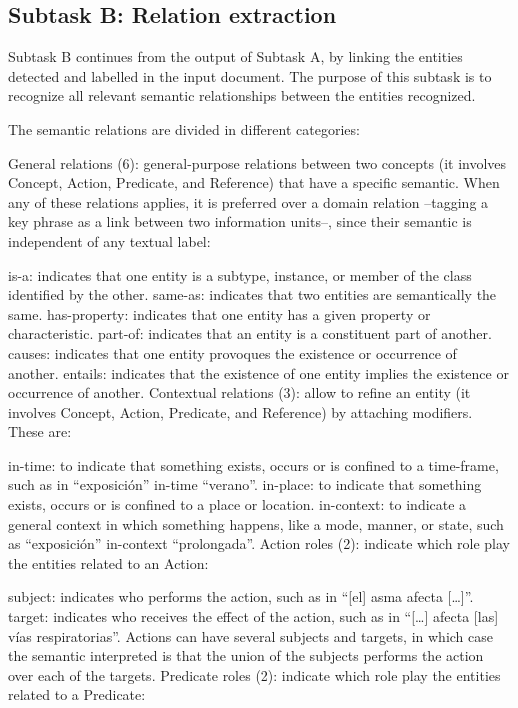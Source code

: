 \documentclass[a4paper,11pt,twocolumn,twoside]{article}
\begin{document}
\subsection{Subtask B: Relation extraction}

Subtask B continues from the output of Subtask A, by linking the entities detected and labelled in the input document. The purpose of this subtask is to recognize all relevant semantic relationships between the entities recognized. 

The semantic relations are divided in different categories:

General relations (6): general-purpose relations between two concepts (it involves Concept, Action, Predicate, and Reference) that have a specific semantic. When any of these relations applies, it is preferred over a domain relation –tagging a key phrase as a link between two information units–, since their semantic is independent of any textual label:

is-a: indicates that one entity is a subtype, instance, or member of the class identified by the other.
same-as: indicates that two entities are semantically the same.
has-property: indicates that one entity has a given property or characteristic.
part-of: indicates that an entity is a constituent part of another.
causes: indicates that one entity provoques the existence or occurrence of another.
entails: indicates that the existence of one entity implies the existence or occurrence of another.
Contextual relations (3): allow to refine an entity (it involves Concept, Action, Predicate, and Reference) by attaching modifiers. These are:

in-time: to indicate that something exists, occurs or is confined to a time-frame, such as in “exposición” in-time “verano”.
in-place: to indicate that something exists, occurs or is confined to a place or location.
in-context: to indicate a general context in which something happens, like a mode, manner, or state, such as “exposición” in-context “prolongada”.
Action roles (2): indicate which role play the entities related to an Action:

subject: indicates who performs the action, such as in “[el] asma afecta […]”.
target: indicates who receives the effect of the action, such as in “[…] afecta [las] vías respiratorias”. Actions can have several subjects and targets, in which case the semantic interpreted is that the union of the subjects performs the action over each of the targets.
Predicate roles (2): indicate which role play the entities related to a Predicate:
\end{document}
